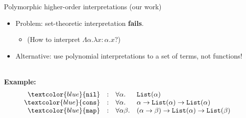 \documentclass[10pt,presentation,color=names]{beamer}
\newcommand{\arrtype}{\rightarrow}
\newcommand{\symb}[1]{\textcolor{blue}{\mathtt{#1}}}
\newcommand{\List}{\mathtt{List}}
\newcommand{\nil}{\symb{nil}}
\newcommand{\cons}{\symb{cons}}
\newcommand{\map}{\symb{map}}
\begin{document}
\begin{frame}{Polymorphic higher-order interpretations (our work)}

\begin{itemize}
\item Problem: set-theoretic interpretation \alert{\textbf{fails}}.
  \begin{itemize}
  \item[] (How to interpret $\Lambda \alpha.\lambda x:\alpha.x$?)
  \end{itemize}

\item\pause Alternative: use polynomial interpretations to a set of \alert{terms}, not \alert{functions}!
\end{itemize}

\ \\\pause\textbf{Example:}
\[
\begin{array}{rcll}
\nil & : & \forall \alpha. & \List(\alpha) \\
\cons & : & \forall \alpha. & \alpha \arrtype \List(\alpha) \arrtype \List(\alpha) \\
\map & : & \forall \alpha \beta. & (\alpha \arrtype \beta) \arrtype \List(\alpha) \arrtype \List(\beta) \\
\end{array}
\]


\end{frame}
\end{document}
